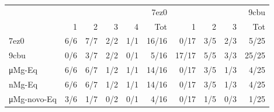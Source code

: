 \begin{tabular}{lrrrrrrrrr}
\toprule
 & \multicolumn{5}{r}{7ez0} & \multicolumn{4}{r}{9cbu} \\
 & 1 & 2 & 3 & 4 & Tot & 1 & 2 & 3 & Tot \\
\midrule
7ez0 & {\cellcolor[HTML]{FCBEA5}} \color[HTML]{000000} 6/6 & {\cellcolor[HTML]{FCB296}} \color[HTML]{000000} 7/7 & {\cellcolor[HTML]{FEE8DD}} \color[HTML]{000000} 2/2 & {\cellcolor[HTML]{FFEEE7}} \color[HTML]{000000} 1/1 & {\cellcolor[HTML]{EB372A}} \color[HTML]{F1F1F1} 16/16 & {\cellcolor[HTML]{FFF5F0}} \color[HTML]{000000} 0/17 & {\cellcolor[HTML]{FEE1D4}} \color[HTML]{000000} 3/5 & {\cellcolor[HTML]{FEE8DD}} \color[HTML]{000000} 2/3 & {\cellcolor[HTML]{FDCAB5}} \color[HTML]{000000} 5/25 \\
9cbu & {\cellcolor[HTML]{FFF5F0}} \color[HTML]{000000} 0/6 & {\cellcolor[HTML]{FEE1D4}} \color[HTML]{000000} 3/7 & {\cellcolor[HTML]{FEE8DD}} \color[HTML]{000000} 2/2 & {\cellcolor[HTML]{FFF5F0}} \color[HTML]{000000} 0/1 & {\cellcolor[HTML]{FDCAB5}} \color[HTML]{000000} 5/16 & {\cellcolor[HTML]{DE2B25}} \color[HTML]{F1F1F1} 17/17 & {\cellcolor[HTML]{FDCAB5}} \color[HTML]{000000} 5/5 & {\cellcolor[HTML]{FEE1D4}} \color[HTML]{000000} 3/3 & {\cellcolor[HTML]{67000D}} \color[HTML]{F1F1F1} 25/25 \\
μMg-Eq & {\cellcolor[HTML]{FCBEA5}} \color[HTML]{000000} 6/6 & {\cellcolor[HTML]{FCBEA5}} \color[HTML]{000000} 6/7 & {\cellcolor[HTML]{FFEEE7}} \color[HTML]{000000} 1/2 & {\cellcolor[HTML]{FFEEE7}} \color[HTML]{000000} 1/1 & {\cellcolor[HTML]{F5533B}} \color[HTML]{F1F1F1} 14/16 & {\cellcolor[HTML]{FFF5F0}} \color[HTML]{000000} 0/17 & {\cellcolor[HTML]{FEE1D4}} \color[HTML]{000000} 3/5 & {\cellcolor[HTML]{FFEEE7}} \color[HTML]{000000} 1/3 & {\cellcolor[HTML]{FDD7C6}} \color[HTML]{000000} 4/25 \\
nMg-Eq & {\cellcolor[HTML]{FCBEA5}} \color[HTML]{000000} 6/6 & {\cellcolor[HTML]{FCBEA5}} \color[HTML]{000000} 6/7 & {\cellcolor[HTML]{FFEEE7}} \color[HTML]{000000} 1/2 & {\cellcolor[HTML]{FFEEE7}} \color[HTML]{000000} 1/1 & {\cellcolor[HTML]{F5533B}} \color[HTML]{F1F1F1} 14/16 & {\cellcolor[HTML]{FFF5F0}} \color[HTML]{000000} 0/17 & {\cellcolor[HTML]{FEE1D4}} \color[HTML]{000000} 3/5 & {\cellcolor[HTML]{FFEEE7}} \color[HTML]{000000} 1/3 & {\cellcolor[HTML]{FDD7C6}} \color[HTML]{000000} 4/25 \\
μMg-novo-Eq & {\cellcolor[HTML]{FEE1D4}} \color[HTML]{000000} 3/6 & {\cellcolor[HTML]{FFEEE7}} \color[HTML]{000000} 1/7 & {\cellcolor[HTML]{FFF5F0}} \color[HTML]{000000} 0/2 & {\cellcolor[HTML]{FFF5F0}} \color[HTML]{000000} 0/1 & {\cellcolor[HTML]{FDD7C6}} \color[HTML]{000000} 4/16 & {\cellcolor[HTML]{FFF5F0}} \color[HTML]{000000} 0/17 & {\cellcolor[HTML]{FFEEE7}} \color[HTML]{000000} 1/5 & {\cellcolor[HTML]{FFF5F0}} \color[HTML]{000000} 0/3 & {\cellcolor[HTML]{FFEEE7}} \color[HTML]{000000} 1/25 \\

\end{tabular}

